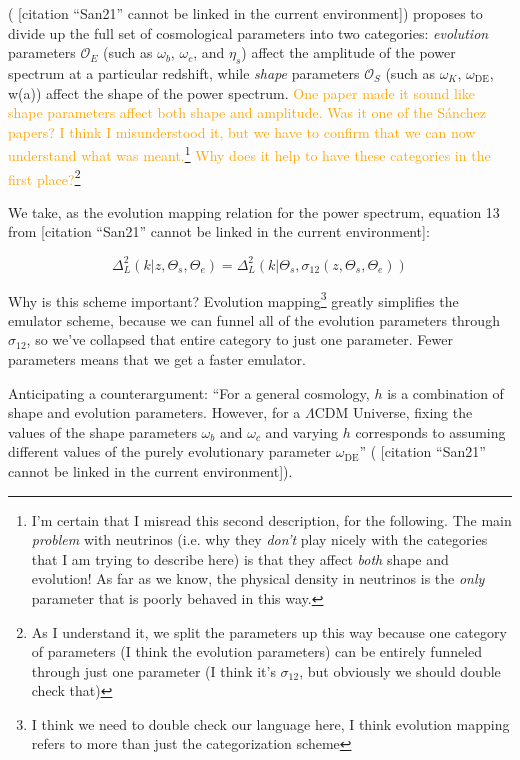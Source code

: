 \documentclass[11pt]{article}
\newcommand{\cbib}[1]
{\IfFileExists{biblatex.sty}
{\cite{#1}}
{[citation ``#1'' cannot be linked in the current environment]}}
\begin{document}
(\cbib{San21}) proposes to divide up the full set of cosmological
parameters into two categories: \textit{evolution} parameters $\mathcal{O}_E$
(such as $\omega_b$, $\omega_c$, and $\eta_s$)
affect the amplitude of the power spectrum at a particular redshift, while
\textit{shape} parameters $\mathcal{O}_S$
(such as $\omega_K$, $\omega_\text{DE}$, w(a))
affect the shape of the power
spectrum. \textcolor{orange}{One paper made it sound like shape parameters
affect both shape and amplitude. Was it one of the S\'{a}nchez papers? I think
I misunderstood it, but we have to confirm that we can now understand what was
meant.\footnote{
    I'm certain that I misread this second description, for the following.
    The main \textit{problem} with neutrinos (i.e. why they \textit{don't}
    play nicely with the categories that I am trying to describe here)
    is that they affect \textit{both} shape and evolution! As far as we know,
    the physical density in neutrinos is the \textit{only} parameter that
    is poorly behaved in this way.
}
Why does it help to have these categories in the first place?}\footnote{
    As I understand it, we split the parameters up this way because
    one category of parameters (I think the evolution parameters)
    can be entirely funneled through just one parameter
    (I think it's $\sigma_{12}$, but obviously we should double check that)
}

We take, as the evolution mapping relation for the power spectrum, equation 13
from \cbib{San21}:

\begin{equation}
    \Delta^2_L (k | z, \Theta_s, \Theta_e)
    =
    \Delta_L^2 (k | \Theta_s, \sigma_{12} \left( z, \Theta_s, \Theta_e \right))
\end{equation}

Why is this scheme important? Evolution mapping\footnote{I think we need to
double check our language here, I think evolution mapping refers to more than
just the categorization scheme} greatly simplifies the emulator
scheme, because we can
funnel all of the evolution parameters through $\sigma_{12}$, so we've
collapsed that entire category to just one parameter. Fewer parameters means
that we get a faster emulator.

Anticipating a counterargument: ``For a general cosmology, $h$ is a combination
of shape and evolution parameters. However, for a $\Lambda$CDM Universe, fixing
the values of the shape parameters $\omega_b$ and $\omega_c$ and varying $h$
corresponds to assuming different values of the purely evolutionary parameter
$\omega_\text{DE}$'' (\cbib{San21}).
\end{document}
